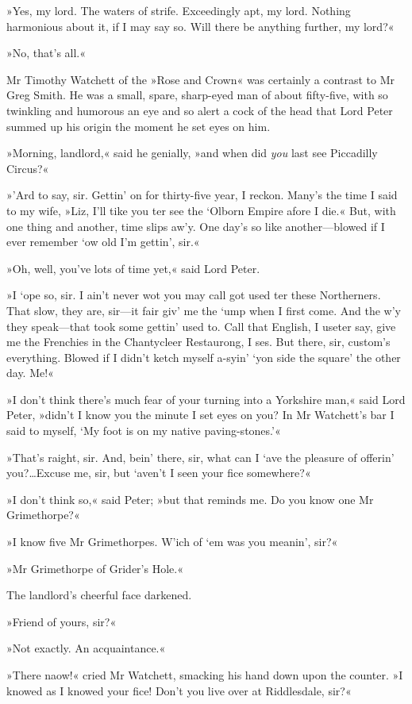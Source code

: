 »Yes, my lord. The waters of strife. Exceedingly apt, my lord. Nothing harmonious about it, if I may say so. Will there be anything further, my lord?«

»No, that's all.«

Mr Timothy Watchett of the »Rose and Crown« was certainly a contrast to Mr Greg Smith. He was a small, spare, sharp-eyed man of about fifty-five, with so twinkling and humorous an eye and so alert a cock of the head that Lord Peter summed up his origin the moment he set eyes on him.

»Morning, landlord,« said he genially, »and when did \textit{you} last see Piccadilly Circus?«

»'Ard to say, sir. Gettin' on for thirty-five year, I reckon. Many's the time I said to my wife, »Liz, I'll tike you ter see the `Olborn Empire afore I die.« But, with one thing and another, time slips aw'y. One day's so like another—blowed if I ever remember `ow old I'm gettin', sir.«

»Oh, well, you've lots of time yet,« said Lord Peter.

»I `ope so, sir. I ain't never wot you may call got used ter these Northerners. That slow, they are, sir—it fair giv' me the `ump when I first come. And the w'y they speak—that took some gettin' used to. Call that English, I useter say, give me the Frenchies in the Chantycleer Restaurong, I ses. But there, sir, custom's everything. Blowed if I didn't ketch myself a-syin' `yon side the square' the other day. Me!«

»I don't think there's much fear of your turning into a Yorkshire man,« said Lord Peter, »didn't I know you the minute I set eyes on you? In Mr Watchett's bar I said to myself, `My foot is on my native paving-stones.'«

»That's raight, sir. And, bein' there, sir, what can I `ave the pleasure of offerin' you?\dots Excuse me, sir, but `aven't I seen your fice somewhere?«

»I don't think so,« said Peter; »but that reminds me. Do you know one Mr Grimethorpe?«

»I know five Mr Grimethorpes. W'ich of `em was you meanin', sir?«

»Mr Grimethorpe of Grider's Hole.«

The landlord's cheerful face darkened.

»Friend of yours, sir?«

»Not exactly. An acquaintance.«

»There naow!« cried Mr Watchett, smacking his hand down upon the counter. »I knowed as I knowed your fice! Don't you live over at Riddlesdale, sir?«


